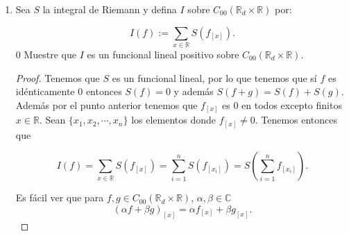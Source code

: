 \documentclass[letter,twoside,12pt]{article}
\numberwithin{equation}{section}
\begin{document}
\begin{enumerate}[label = (\textbf{\arabic*.})]
\begin{enumerate}[label = (\textbf{\roman*.})]
\begin{proof}
\begin{proof}
Para la otra implicación tómese un conjunto $A \subseteq X $ de cardinalidad infinita. La colección de singletons de los elementos de $ A $ es una cobertura abierta de $A$ que no tiene subcobertura finita pues si retiramos un solo singleton de la colección dejaríamos de cubrir el elemento correspondiente. Por lo tanto la condición que $K $ sea finito es necesaria para que $K$ sea compacto.
\end{proof}

Tómese cualquier función $f$ con soporte compacto y sea $K$ el conjunto compacto correspondiente. Por un teorema de topología (ver \cite[Teorema 26.5]{munkres}) tenemos que la imagen de $K$ bajo una función continua es compacta. Por lo tanto, si $ \pi_1$ y $\pi_2 $ son las proyecciones de $\mathbb{R}_d \times \mathbb{R} $ a $ \mathbb{R}_d $ y $ \mathbb{R} $ respectivamente tenemos que $ \pi_1(K) $ y $ \pi_2(K) $ son compactos y por lo tanto $ \pi_1(K) \times \pi_2(K) $ (ver nuevamente \cite[Teorema 26.7]{munkres}). Adicionalmente por el \textbf{\autoref{le:dcompacto}} sabemos que $ \pi_1(K)$ es finito. Tenemos que $ K \subseteq \pi_1(K) \times \pi_2(K)$. Luego como $f$ es de soporte compacto tenemos que para cualquier $x \not \in \pi_1(K)$, $f_{[x]}(y)= f(x,y) = 0$ para cualquier $y \in \mathbb{R}$. Así que probamos que $ f_{[x]} $ es idénticamente 0 para cofinitos $x \in \mathbb{R}$.
\end{proof}
\item Sea $ S $ la integral de Riemann y defina $ I $ sobre $ C_{00}(\mathbb{R}_d \times \mathbb{R}) $ por:

$$ I(f) := \sum_{x \in \mathbb{R}}S(f_{[x]}). $$
0
Muestre que $ I $ es un funcional lineal positivo sobre $ C_{00}(\mathbb{R}_d \times \mathbb{R}) $.

\begin{proof}
Tenemos que $S $ es un funcional lineal, por lo que tenemos que sí $f$ es idénticamente 0 entonces $S(f)=0 $ y además $ S(f+g)= S(f)+S(g)$. Además por el punto anterior tenemos que $f_{[x]}$ es 0 en todos excepto finitos $x \in \mathbb{R}$. Sean $ \{x_1, x_2, \cdots, x_n\} $ los elementos donde $f_{[x]} \not = 0$. Tenemos entonces que

\begin{equation*}
	I(f) = \sum_{x \in \mathbb{R}}S(f_{[x]} ) = \sum_{i=1 }^n S(f_{[x_i]}) = S(\sum_{i=1 }^n f_{[x_i]}).
\end{equation*}

Es fácil ver que para $ f,g \in C_{00}(\mathbb{R}_d \times \mathbb{R})$, $\alpha, \beta \in \mathbb{C} $ 
$$ (\alpha f+\beta g)_{[x]} = \alpha f_{[x]} + \beta g_{[x]}. $$


\end{proof}
\end{enumerate}
\end{enumerate}
\end{document}
